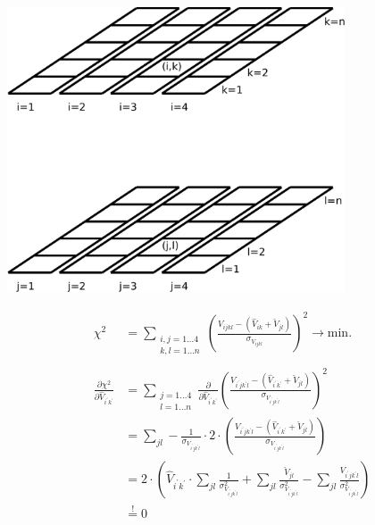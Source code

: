 \documentclass[a4paper]{article}
\begin{document}
\begin{center}
\includegraphics[width=0.75\textwidth]{sketch.pdf}
\vskip 10mm

\begin{align*}
\chi^2 &= \sum_{\substack{i, j = 1 \ldots 4 \\ k, l = 1 \ldots n}}
        {\left( \frac{V_{i j k l} - \left( \hat{V}_{i k} + \check{V}_{j l} \right)}{\sigma_{V_{i j k l}}} \right)}^2 \to \text{min.} \\
\\
\frac{\partial \chi^2}{\partial \hat{V}_{i^\prime k^\prime}} &= \sum_{\substack{j = 1 \ldots 4 \\ l = 1 \ldots n}}
        \frac{\partial}{\partial \hat{V}_{i^\prime k^\prime}} {\left( \frac{V_{i^\prime j k^\prime l} - \left( \hat{V}_{i^\prime k^\prime}
        + \check{V}_{j l} \right)}{\sigma_{V_{i^\prime j k^\prime l}}} \right)}^2 \\
&= \sum_{j l} - \frac{1}{\sigma_{V_{i^\prime j k^\prime l}}} \cdot 2 \cdot {\left( \frac{V_{i^\prime j k^\prime l} - \left( \hat{V}_{i^\prime k^\prime}
        + \check{V}_{j l} \right)}{\sigma_{V_{i^\prime j k^\prime l}}} \right)} \\
&= 2 \cdot \left( \hat{V}_{i^\prime k^\prime} \cdot \sum_{j l} \frac{1}{\sigma_{V_{i^\prime j k^\prime l}}^2}
        + \sum_{j l} \frac{\check{V}_{j l}}{\sigma_{V_{i^\prime j k^\prime l}}^2}
        - \sum_{j l} \frac{V_{i^\prime j k^\prime l}}{\sigma_{V_{i^\prime j k^\prime l}}^2} \right) \\  
&\stackrel{!}{=} 0
\end{align*}


\end{center}
\end{document}
